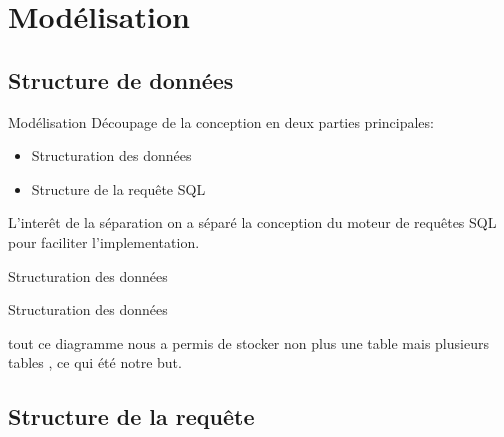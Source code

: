 \documentclass[10pt,handout]{beamer}
\newif\ifplacelogo %
\begin{document}
\section{Modélisation}

\subsection{Structure de données}

\begin{frame}{Modélisation}
Découpage de la conception en deux parties principales:
\begin{itemize}
  \item Structuration des données
  \item Structure de la requête SQL
\end{itemize}
\begin{block}{L'interêt de la séparation}
on a séparé la conception du moteur de requêtes SQL pour faciliter
l'implementation.
  
\end{block}


\end{frame}

\placelogofalse
\begin{frame}{Structuration des données}
\end{frame}
\placelogotrue

\begin{frame}{Structuration des données}
\begin{block}{}
  tout ce diagramme nous a permis de stocker non plus une table mais plusieurs 
  tables , ce qui été notre but. 
\end{block}
\end{frame}

\subsection{Structure de la requête}
\end{document}
